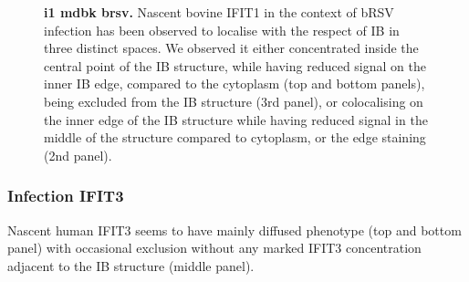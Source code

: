 \begin{figure}
\begin{subfigure}{1\textwidth}
    \end{subfigure}
    \caption[i1 mdbk brsv]{\textbf{i1 mdbk brsv.} Nascent bovine IFIT1 in the context of bRSV infection has been observed to localise with the respect of IB in three distinct spaces. We observed it either concentrated inside the central point of the IB structure, while having reduced signal on the inner IB edge, compared to the cytoplasm (top and bottom panels), being excluded from the IB structure (3rd panel), or colocalising on the inner edge of the IB structure while having reduced signal in the middle of the structure compared to cytoplasm, or the edge staining (2nd panel).}
    \label{fig:i1 mdbk brsv}
\end{figure}


\subsubsection{Infection IFIT3}
Nascent human IFIT3 seems to have mainly diffused phenotype (top and bottom panel) with occasional exclusion without any marked IFIT3 concentration adjacent to the IB structure (middle panel).

